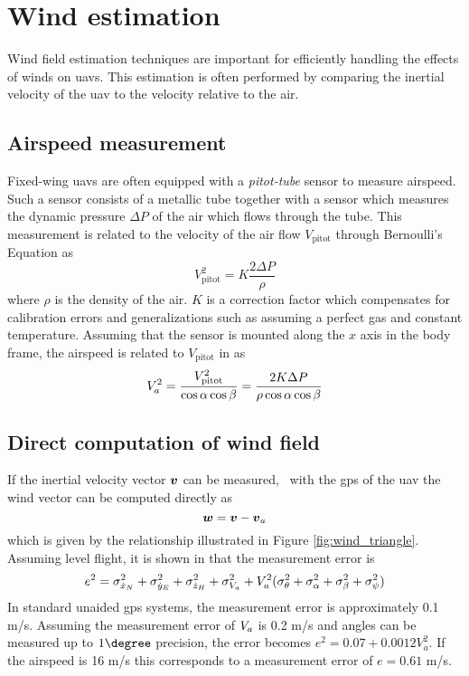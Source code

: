 \section{Wind estimation}
Wind field estimation techniques are important for efficiently handling the effects of winds on \acp{uav}. 
This estimation is often performed by comparing the inertial velocity of the \ac{uav} to the velocity relative to the air.
\subsection{Airspeed measurement}
Fixed-wing \acp{uav} are often equipped with a \textit{pitot-tube} sensor to measure airspeed.
Such a sensor consists of a metallic tube together with a sensor which measures the dynamic pressure $\Delta P$ of 
the air which flows through the tube. This measurement is related to the velocity of the air flow $V_{\text{pitot}}$ through 
Bernoulli's Equation as 
\begin{equation}
    V^2_{\text{pitot}} = K\frac{2\Delta P}{\rho}
\end{equation}
where $\rho$ is the density of the air. $K$ is a correction factor which compensates for calibration errors and 
generalizations such as assuming a perfect gas and constant temperature. Assuming that the sensor is mounted 
along the $x$ axis in the body frame, the airspeed is related to $V_{\text{pitot}}$ in \cite{pitot} as
\begin{equation}
    V_a^2=\frac{V^2_{\text{pitot}}}{\cos\alpha\cos\beta}=\frac{2K\Delta P}{\rho\cos\alpha\cos\beta}
\end{equation}  

\subsection{Direct computation of wind field}
If the inertial velocity vector $\boldsymbol{v}$ can be measured, \eg\ with the \ac{gps} of the \ac{uav} the wind vector can be 
computed directly as 
\begin{equation}
    \boldsymbol{w} = \boldsymbol{v} - \boldsymbol{v}_a
\end{equation}
which is given by the relationship illustrated in Figure \ref{fig:wind_triangle}. Assuming level flight, it is shown in \cite{wind_direct_computation} that 
the measurement error is
\begin{equation}
    e^2=\sigma_{\dot{x}_N}^2+\sigma_{\dot{y}_E}^2+\sigma_{\dot{z}_H}^2+\sigma_{V_a}^2 + V_a^2(\sigma_{\theta}^2+\sigma_{\alpha}^2+\sigma_{\beta}^2+\sigma_{\psi}^2)
\end{equation}
In standard unaided \ac{gps} systems, the measurement error is approximately 0.1 m/s. Assuming the measurement error of $V_a$ is 0.2 m/s and angles 
can be measured up to $1\degree$ precision, the error becomes $e^2=0.07+0.0012V_a^2$. If the airspeed is 16 m/s this corresponds to a measurement error of 
$e=0.61$ m/s.

